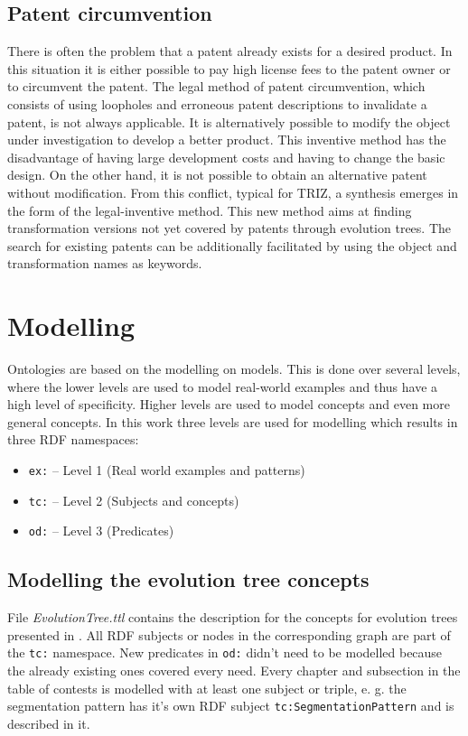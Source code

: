 \documentclass[11pt,a4paper]{article}
\begin{document}
\subsection{Patent circumvention}

There is often the problem that a patent already exists for a desired product. In this situation it is either possible to pay high license fees to the patent owner or to circumvent the patent.
The legal method of patent circumvention, which consists of using loopholes and erroneous patent descriptions to invalidate a patent, is not always applicable.
It is alternatively possible to modify the object under investigation to develop a better product. This inventive method has the disadvantage of having large development costs and having to change the basic design. On the other hand, it is not possible to obtain an alternative patent without modification.
From this conflict, typical for TRIZ, a synthesis emerges in the form of the legal-inventive method. This new method aims at finding transformation versions not yet covered by patents through evolution trees.
The search for existing patents can be additionally facilitated by using the object and transformation names as keywords. 

\section{Modelling}

Ontologies are based on the modelling on models. This is done over several levels, where the lower levels are used to model real-world examples and thus have a high level of specificity. Higher levels are used to model concepts and even more general concepts. In this work three levels are used for modelling which results in three RDF namespaces:

\begin{itemize}[noitemsep]
\item \texttt{ex:} -- Level 1 (Real world examples and patterns)
\item \texttt{tc:} -- Level 2 (Subjects and concepts)
\item \texttt{od:} -- Level 3 (Predicates) 
\end{itemize}

\subsection{Modelling the evolution tree concepts}

File \textit{EvolutionTree.ttl} contains the description for the concepts for evolution trees presented in \cite{Shpakovsky2016}. 
All RDF subjects or nodes in the corresponding graph are part of the \texttt{tc:} namespace. New predicates in \texttt{od:} didn't need to be modelled because the already existing ones covered every need. Every chapter and subsection in the table of contests is modelled with at least one subject or triple, e. g. the segmentation pattern has it's own RDF subject \texttt{tc:SegmentationPattern} and is described in it.
\end{document}
